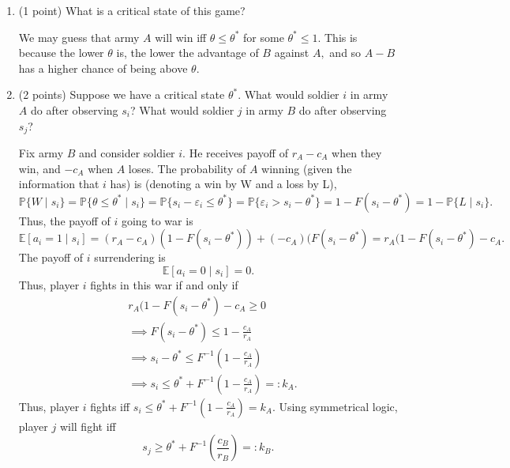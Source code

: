 \documentclass[11pt]{article}
\newcommand{\bbE}{\mathbb{E}}
\newcommand{\bbP}{\mathbb{P}}
\begin{document}
\begin{enumerate}
\begin{solution}
Suppose $\theta <-1.$ Then since $\min A = 0$ and $\max B = 1,$ we have that $\min A - B = -1.$ Thus, $A-B \geq -1 >\theta$ no matter the combination of the armies, and so \textbf{$A$ will win no matter what.} Using symmetrical logic as the above case, \textbf{a soldier $i$ will fight unconditionally} and \textbf{a soldier $j$ will surrender unconditionally.}
\end{solution}
    \item (1 point) What is a critical state of this game?
\begin{solution}
    We may guess that army $A$ will win iff $\boxed{\theta  \leq \theta^*}$ for some $\theta^* \leq 1.$ This is because the lower $\theta$ is, the lower the advantage of $B$ against $A,$ and so $A - B$ has a higher chance of being above $\theta.$   
\end{solution}
    \item (2 points) Suppose we have a critical state \( \theta^* \). What would soldier \( i \) in army \( A \) do after observing \( s_i \)? What would soldier \( j \) in army \( B \) do after observing \( s_j \)?
\begin{solution}
    Fix army $B$ and consider soldier $i.$ He receives payoff of $r_A  - c_A$ when they win, and $-c_A$ when $A$ loses. The probability of $A$ winning (given the information that $i$ has) is (denoting a win by W and a loss by L), 
    \[\bbP\{W \mid s_i\} = \bbP\{\theta \leq \theta^* \mid s_i\} = \bbP\{s_i - \varepsilon_i \leq \theta^*\} = \bbP\{\varepsilon_i > s_i - \theta^*\} = 1- F(s_i - \theta^*) = 1-\bbP\{L\mid s_i\}.\] Thus, the payoff of $i$ going to war is 
    \[\bbE[a_i = 1 \mid s_i] = (r_A - c_A)(1- F(s_i - \theta^*)) + (-c_A)(F(s_i - \theta^*) = r_A(1- F(s_i - \theta^*) - c_A.\] The payoff of $i$ surrendering is
    \[\bbE[a_i = 0 \mid s_i] = 0.\] Thus, player $i$ fights in this war if and only if
    \begin{align*}
        &r_A(1- F(s_i - \theta^*) - c_A \geq 0\\
        &\implies F(s_i - \theta^*) \leq 1 - \frac{c_A}{r_A}\\
        &\implies s_i- \theta^* \leq F^{-1}(1 - \frac{c_A}{r_A})\\
        &\implies \boxed{s_i \leq \theta^* + F^{-1}(1 - \frac{c_A}{r_A})} =: k_A.
    \end{align*}
Thus, player $i$ fights iff $s_i \leq \theta^* + F^{-1}(1 - \frac{c_A}{r_A}) = k_A.$ Using symmetrical logic, player $j$ will fight iff 
\[\boxed{s_j \geq \theta^* + F^{-1}(\frac{c_B}{r_B})} =: k_B.\]

\end{solution}
\end{enumerate}
\end{document}
